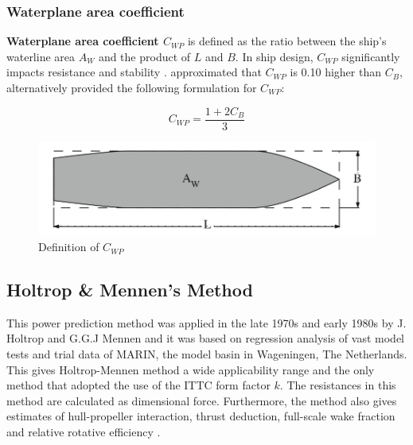 \subsubsection*{Waterplane area coefficient}

\textbf{Waterplane area coefficient $C_{WP}$} is defined as the ratio between the ship's waterline area $A_{W}$ and the product of $L$ and $B$. In ship design, $C_{WP}$ significantly impacts resistance and stability .  approximated that $C_{WP}$ is 0.10 higher than $C_B$, alternatively  provided the following formulation for $C_{WP}$:

\begin{equation}
    \label{eqn:cwp_Schneekluth}
    C_{WP} = \frac{1+2C_B}{3}
\end{equation}

\begin{figure}[ht]
    \centering
        \includegraphics[width=.5\textwidth]{02_figures/biran14_cwp.jpg}
        \caption{Definition of $C_{WP}$ }
        \label{fig:biran_cwp}
\end{figure}

\subsection{Holtrop \& Mennen's Method}\label{sec:foc_calc}

This power prediction method was applied in the late 1970s and early 1980s by J. Holtrop and G.G.J Mennen and it was based on regression analysis of vast model tests and trial data of MARIN, the model basin in Wageningen, The Netherlands. This gives Holtrop-Mennen method a wide applicability range and the only method that adopted the use of the ITTC form factor $k$. The resistances in this method are calculated as dimensional force. Furthermore, the method also gives estimates of hull-propeller interaction, thrust deduction, full-scale wake fraction and relative rotative efficiency . 

